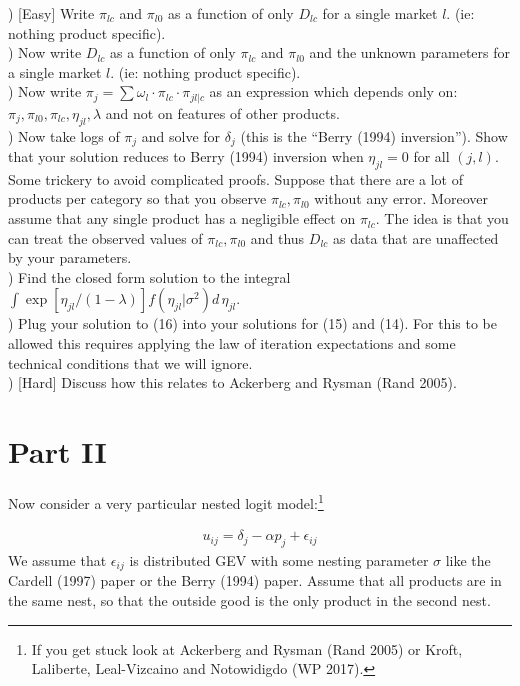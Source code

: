 \documentclass[12pt]{article}
\begin{document}
) [Easy]  Write $\pi_{lc}$ and $\pi_{l0}$ as a function of only $D_{lc}$ for a single market $l$.  (ie: nothing product specific).\\

) Now write $D_{lc}$ as a function of only $\pi_{lc}$ and $\pi_{l0}$ and the unknown parameters for a single market $l$. (ie: nothing product specific).\\

) Now write $\pi_j = \sum \omega_l \cdot \pi_{lc} \cdot \pi_{jl|c}$ as an expression which depends only on: $\pi_j, \pi_{l0},\pi_{lc},\eta_{jl},\lambda$ and not on features of other products.\\

) Now take logs of $\pi_j$ and solve for $\delta_j$ (this is the ``Berry (1994) inversion''). Show that your solution reduces to Berry (1994) inversion when $\eta_{jl} = 0$ for all $(j,l)$.\\

\noindent Some trickery to avoid complicated proofs. Suppose that there are a lot of products per category so that you observe $\pi_{lc}, \pi_{l0}$ without any error. Moreover assume that any single product has a negligible effect on $\pi_{lc}$. The idea is that you can treat the observed values of $\pi_{lc}, \pi_{l0}$ and thus $D_{lc}$ as data that are unaffected by your parameters.\\

) Find the closed form solution to the integral $\int \exp[\eta_{jl}/(1-\lambda)] f(\eta_{jl} | \sigma^2) d\, \eta_{jl}$.\\

) Plug your solution to (16) into your solutions for (15) and (14). For this to be allowed this requires applying the law of iteration expectations and some technical conditions that we will ignore. \\


) [Hard] Discuss how this relates to Ackerberg and Rysman (Rand 2005).


\section*{\normalsize Part II}
Now consider a very particular nested logit model:\footnote{If you get stuck look at Ackerberg and Rysman (Rand 2005) or Kroft, Laliberte, Leal-Vizcaino and Notowidigdo (WP 2017).}

\begin{eqnarray*}
u_{ij} = \delta_j - \alpha p_j + \epsilon_{ij}
\end{eqnarray*}
We assume that $\epsilon_{ij}$ is distributed GEV with some nesting parameter $\sigma$ like the Cardell (1997) paper or the Berry (1994) paper. Assume that all products are in the same nest, so that the outside good is the only product in the second nest.\\
\end{document}
